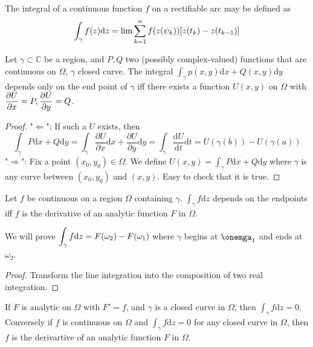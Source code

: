 The integral of a continuous function  $ f $ on a rectifiable arc may be defined as 
\[\displaystyle\int_\gamma f(z)\mathrm{d}z=\lim \sum_{k=1}^nf(z(\psi_k))[z(t_k)-z(t_{k-1})]\] 
\begin{theorem}
    Let  $ \gamma\subset \mathbb{C} $ be a region, and  $ P,Q $ two (possibly complex-valued) functions that are continuous on  $ \Omega $,  $ \gamma $ closed curve. The integral  $ \int_\gamma p(x,y)\mathrm{d}x+Q(x,y)\mathrm{d}y $ depends only on the end point of  $ \gamma $ iff there exists a function   $ U(x,y) $ on  $ \Omega $ with  $ \displaystyle\frac{\partial U}{\partial x}=P,\frac{\partial U}{\partial y}=Q $.  
\end{theorem}
\begin{proof}
    "$ \Leftarrow $": If such a  $ U $ exists, then 
    \[\int_\gamma P\mathrm{d}x+Q\mathrm{d}y=\int_\gamma\frac{\partial U}{\partial x}\mathrm{d}x+\frac{\partial U}{\partial y}\mathrm{d}y=\int_\gamma\frac{\mathrm{d}U}{\mathrm{d}t}\mathrm{d}t=U(\gamma(b))-U(\gamma(a))\] 
    "$ \Rightarrow $": Fix a point  $ (x_0,y_0)\in \Omega $. We define  $ U(x,y)=\int_\gamma P\mathrm{d}x+Q\mathrm{d}y$ where  $ \gamma $ is any curve between  $ (x_0,y_0) $ and  $ (x,y) $. Easy to check that it is true.     
\end{proof}
\begin{theorem}
    Let  $ f $ be continuous on a region  $ \Omega $  containing  $ \gamma $.  $ \int_\gamma f\mathrm{d}z $ depends on the endpoints iff  $ f $ is the derivative of an analytic function  $ F $ in  $ \Omega $.     
\end{theorem}
\begin{remark}
    We will prove  $ \displaystyle\int_\gamma f\mathrm{d}z=F(\omega_2)-F(\omega_1) $ where  $ \gamma $ begins at  $ \onemga_1 $ and ends at  $ \omega_2 $.    
\end{remark}
\begin{proof}
    Transform  the line integration into  the composition of two real integration.
\end{proof}
\begin{corollary}
    If  $ F $ is analytic on  $ \Omega $ with  $ F'=f $, and  $ \gamma $ is a closed curve in  $\Omega $, then  $ \int_\gamma f\mathrm{d}z=0 $. Conversely if  $ f $  is continuous on  $ \Omega $ and  $ \int_\gamma f\mathrm{d}z=0 $ for any closed curve in  $ \Omega $, then  $ f $ is the derivartive of an analytic function  $ F $ in  $\Omega $.          
\end{corollary}

